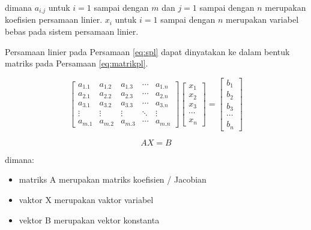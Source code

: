 \documentclass[]{book}
\providecommand{\tightlist}{%
  \setlength{\itemsep}{0pt}\setlength{\parskip}{0pt}}
\theoremstyle{definition}
\theoremstyle{definition}
\theoremstyle{definition}
\theoremstyle{remark}
\begin{document}
dimana \(a_{i.j}\) untuk \(i=1\) sampai dengan \(m\) dan \(j=1\) sampai dengan \(n\) merupakan koefisien persamaan linier. \(x_i\) untuk \(i=1\) sampai dengan \(n\) merupakan variabel bebas pada sistem persamaan linier.

Persamaan linier pada Persamaan \eqref{eq:spl} dapat dinyatakan ke dalam bentuk matriks pada Persamaan \eqref{eq:matrikpl}.

\begin{equation}
\begin{bmatrix}
     a_{1.1} & a_{1.2} & a_{1.3} &\cdots& a_{1.n}           \\[0.3em]
     a_{2.1} & a_{2.2} & a_{2.3} &\cdots& a_{2.n}           \\[0.3em]
     a_{3.1} & a_{3.2} & a_{3.3} &\cdots& a_{3.n}           \\[0.3em]
     \vdots  & \vdots  & \vdots  &\ddots& \vdots            \\[0.3em]
     a_{m.1} & a_{m.2} & a_{m.3} &\cdots& a_{m.n}
     \end{bmatrix}
\begin{bmatrix}
     x_1                                          \\[0.3em]
     x_2                                          \\[0.3em]
     x_3                                          \\[0.3em]
     \cdots                                       \\[0.3em]
     x_n                                       
     \end{bmatrix}
= \begin{bmatrix}
     b_1                                          \\[0.3em]
     b_2                                          \\[0.3em]
     b_3                                          \\[0.3em]
     \cdots                                       \\[0.3em]
     b_n                                       
     \end{bmatrix}
  \label{eq:matrikpl}
\end{equation}

\begin{equation}
AX=B
  \label{eq:matrikpl2}
\end{equation}

dimana:

\begin{itemize}
\tightlist
\item
  matriks A merupakan matriks koefisien / Jacobian
\item
  vaktor X merupakan vaktor variabel
\item
  vektor B merupakan vektor konstanta
\end{itemize}
\end{document}
